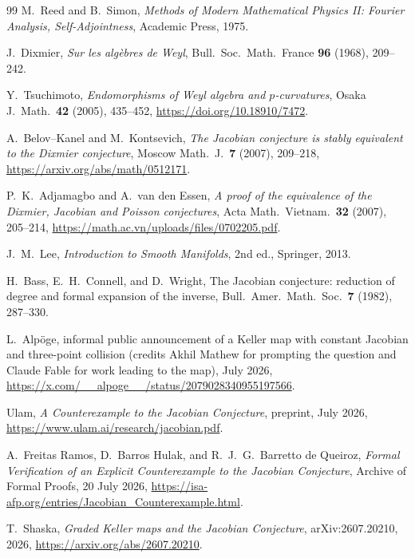 ﻿\documentclass[11pt]{article}
\begin{document}
\footnotesize
\sloppy
\raggedright
\begin{thebibliography}{99}
M.~Reed and B.~Simon, \emph{Methods of Modern Mathematical Physics II: Fourier Analysis, Self-Adjointness}, Academic Press, 1975.

J.~Dixmier, \emph{Sur les alg\`ebres de Weyl}, Bull.\ Soc.\ Math.\ France \textbf{96} (1968), 209--242.

Y.~Tsuchimoto, \emph{Endomorphisms of Weyl algebra and
\(p\)-curvatures}, Osaka J.\ Math.\ \textbf{42} (2005), 435--452,
\url{https://doi.org/10.18910/7472}.

A.~Belov--Kanel and M.~Kontsevich, \emph{The Jacobian conjecture is
stably equivalent to the Dixmier conjecture}, Moscow Math.\ J.\
\textbf{7} (2007), 209--218,
\url{https://arxiv.org/abs/math/0512171}.

P.~K.~Adjamagbo and A.~van den Essen, \emph{A proof of the equivalence of
the Dixmier, Jacobian and Poisson conjectures}, Acta Math.\ Vietnam.\
\textbf{32} (2007), 205--214,
\url{https://math.ac.vn/uploads/files/0702205.pdf}.

J.~M.~Lee, \emph{Introduction to Smooth Manifolds}, 2nd ed., Springer, 2013.

\bibitem{BassCW}
H.~Bass, E.~H.~Connell, and D.~Wright, The Jacobian conjecture: reduction of degree and formal expansion of the inverse, Bull.\ Amer.\ Math.\ Soc.\ \textbf{7} (1982), 287--330.

\bibitem{Alpoge2026}
L.~Alp\"oge, informal public announcement of a Keller map with constant
Jacobian and three-point collision (credits Akhil Mathew for prompting the
question and Claude Fable for work leading to the map), July 2026,
\url{https://x.com/__alpoge__/status/2079028340955197566}.

Ulam, \emph{A Counterexample to the Jacobian Conjecture}, preprint, July 2026,
\url{https://www.ulam.ai/research/jacobian.pdf}.

A.~Freitas Ramos, D.~Barros Hulak, and R.~J.~G.~Barretto de Queiroz,
\emph{Formal Verification of an Explicit Counterexample to the Jacobian
Conjecture}, Archive of Formal Proofs, 20 July 2026,
\url{https://isa-afp.org/entries/Jacobian_Counterexample.html}.

\bibitem{Shaska2026}
T.~Shaska, \emph{Graded Keller maps and the Jacobian Conjecture},
arXiv:2607.20210, 2026,
\url{https://arxiv.org/abs/2607.20210}.


\end{thebibliography}
\end{document}
